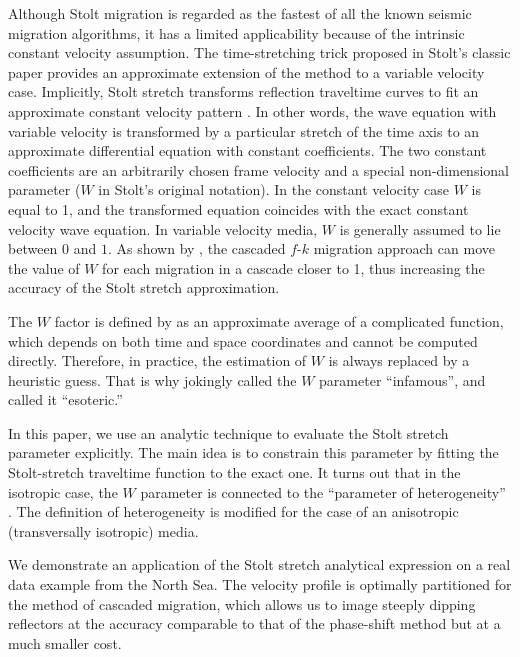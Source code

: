 Although Stolt migration is regarded as the fastest of all the known
seismic migration algorithms, it has a limited applicability because
of the intrinsic constant velocity assumption. The time-stretching
trick proposed in Stolt's classic paper \cite{GEO43.01.00230048}
provides an approximate extension of the method to a variable velocity
case.  Implicitly, Stolt stretch transforms reflection traveltime
curves to fit an approximate constant velocity pattern
\cite{levin35,Levin.sep.42.373,Claerbout.blackwell.85}. In other
words, the wave equation with variable velocity is transformed by a
particular stretch of the time axis to an approximate differential
equation with constant coefficients. The two constant coefficients are
an arbitrarily chosen frame velocity and a special non-dimensional
parameter ($W$ in Stolt's original notation). In the constant velocity
case $W$ is equal to 1, and the transformed equation coincides with
the exact constant velocity wave equation. In variable velocity media,
$W$ is generally assumed to lie between $0$ and $1$. As shown by
, the cascaded $f$-$k$ migration
approach can move the value of $W$ for each migration in a cascade
closer to 1, thus increasing the accuracy of the Stolt stretch
approximation.

The $W$ factor is defined by  as an
approximate average of a complicated function, which depends on both
time and space coordinates and cannot be computed directly.
Therefore, in practice, the estimation of $W$ is always replaced by a
heuristic guess.  That is why  jokingly called the
$W$ parameter ``infamous'', and  called it
``esoteric.''

In this paper, we use an analytic technique to evaluate the Stolt
stretch parameter explicitly. The main idea is to constrain this
parameter by fitting the Stolt-stretch traveltime function to the
exact one.  It turns out that in the isotropic case, the $W$ parameter
is connected to the ``parameter of heterogeneity''
\cite{ussr,Sword.sep.51.313,castle,nmo}. The definition of
heterogeneity is modified for the case of an anisotropic
(transversally isotropic) media.

We demonstrate an application of the Stolt stretch analytical
expression on a real data example from the North Sea. The velocity
profile is optimally partitioned for the method of cascaded migration,
which allows us to image steeply dipping reflectors at the accuracy
comparable to that of the phase-shift method but at a much smaller
cost.

